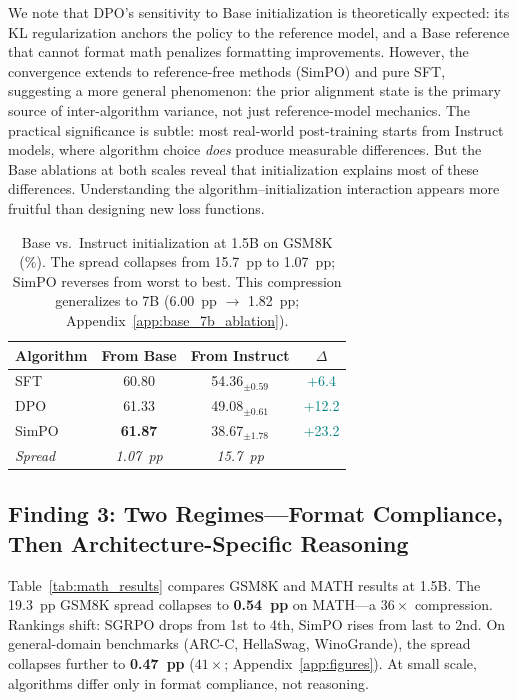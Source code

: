 \documentclass{article}
\begin{document}
We note that DPO's sensitivity to Base initialization is theoretically expected: its KL regularization anchors the policy to the reference model, and a Base reference that cannot format math penalizes formatting improvements. However, the convergence extends to reference-free methods (SimPO) and pure SFT, suggesting a more general phenomenon: the prior alignment state is the primary source of inter-algorithm variance, not just reference-model mechanics.
The practical significance is subtle: most real-world post-training starts from Instruct models, where algorithm choice \emph{does} produce measurable differences. But the Base ablations at both scales reveal that initialization explains most of these differences. Understanding the algorithm--initialization interaction appears more fruitful than designing new loss functions.

\begin{table}[t]
\centering
\caption{Base vs.\ Instruct initialization at 1.5B on GSM8K (\%). The spread collapses from 15.7~pp to 1.07~pp; SimPO reverses from worst to best. This compression generalizes to 7B (6.00~pp $\to$ 1.82~pp; Appendix~\ref{app:base_7b_ablation}).}
\label{tab:base_ablation}
\small
\begin{tabular}{@{}lccc@{}}
\toprule
\textbf{Algorithm} & \textbf{From Base} & \textbf{From Instruct} & \textbf{$\Delta$} \\
\midrule
SFT & 60.80 & 54.36$_{\pm 0.59}$ & \textcolor{teal}{+6.4} \\
DPO & 61.33 & 49.08$_{\pm 0.61}$ & \textcolor{teal}{+12.2} \\
SimPO & \textbf{61.87} & 38.67$_{\pm 1.78}$ & \textcolor{teal}{+23.2} \\
\midrule
\textit{Spread} & \textit{1.07~pp} & \textit{15.7~pp} & \\
\bottomrule
\end{tabular}
\end{table}

\subsection{Finding 3: Two Regimes---Format Compliance, Then Architecture-Specific Reasoning}
\label{sec:format_compliance}

Table~\ref{tab:math_results} compares GSM8K and MATH results at 1.5B. The 19.3~pp GSM8K spread collapses to \textbf{0.54~pp} on MATH---a $36\times$ compression. Rankings shift: SGRPO drops from 1st to 4th, SimPO rises from last to 2nd. On general-domain benchmarks (ARC-C, HellaSwag, WinoGrande), the spread collapses further to \textbf{0.47~pp} ($41\times$; Appendix~\ref{app:figures}). At small scale, algorithms differ only in format compliance, not reasoning.
\end{document}
